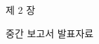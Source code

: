 
\begin{titlepage}
\thispagestyle{empty}

\centering

\vspace{1cm}

\Huge 제 2 장

\vspace{2.5cm}

{\fontsize{42pt}{42pt}
    중간 보고서 발표자료
    \par
}


\end{titlepage}